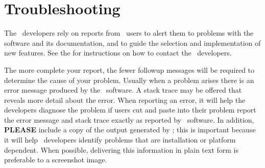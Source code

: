 
\section{Troubleshooting}\label{sec:trouble}

The \OOMMF\ developers rely on reports from \OOMMF\ users to alert them
to problems with the software and its
documentation, and to guide the selection and implementation of new
features.  See the  for instructions on how to contact the
\OOMMF\ developers.

The more complete your report, the fewer followup messages will be
required to determine the cause of your problem.  Usually when a problem
arises there is an error message produced by the \OOMMF\ software.  A
stack trace may be offered that reveals more detail about the error.
When reporting an error, it will help the developers diagnose the
problem if users cut and paste into their problem report the error
message and stack trace exactly as reported by \OOMMF\ software.  In
addition, \textbf{PLEASE} include a copy of the output generated by
; this is important
because it will help \OOMMF\ developers identify problems that are
installation or platform dependent. When possible, delivering this
information in plain text form is preferable to a screenshot image.

